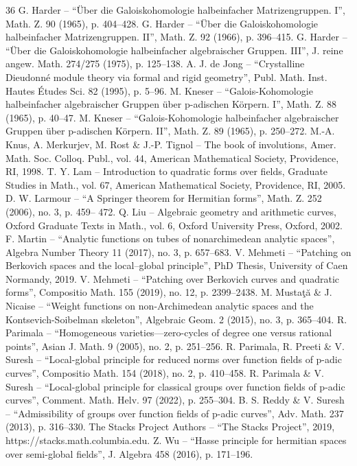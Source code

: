 \documentclass[10pt]{amsart}
\theoremstyle{definition}
\begin{document}
\begin{thebibliography}{36}
 G. Harder – “Über die Galoiskohomologie halbeinfacher Matrizengruppen. I”, Math. Z. 90 (1965), p. 404–428.
 G. Harder – “Über die Galoiskohomologie halbeinfacher Matrizengruppen. II”, Math. Z. 92 (1966), p. 396–415.
 G. Harder – “Über die Galoiskohomologie halbeinfacher algebraischer Gruppen. III”, J. reine angew. Math. 274/275 (1975), p. 125–138.
 A. J. de Jong – “Crystalline Dieudonné module theory via formal and rigid geometry”, Publ. Math. Inst. Hautes Études Sci. 82 (1995), p. 5–96.
 M. Kneser – “Galois-Kohomologie halbeinfacher algebraischer Gruppen über p-adischen Körpern. I”, Math. Z. 88 (1965), p. 40–47.
 M. Kneser – “Galois-Kohomologie halbeinfacher algebraischer Gruppen über p-adischen Körpern. II”, Math. Z. 89 (1965), p. 250–272.
 M.-A. Knus, A. Merkurjev, M. Rost \& J.-P. Tignol – The book of involutions, Amer. Math. Soc. Colloq. Publ., vol. 44, American Mathematical Society, Providence, RI, 1998.
 T. Y. Lam – Introduction to quadratic forms over fields, Graduate Studies in Math., vol. 67, American Mathematical Society, Providence, RI, 2005.
 D. W. Larmour – “A Springer theorem for Hermitian forms”, Math. Z. 252 (2006), no. 3, p. 459– 472.
 Q. Liu – Algebraic geometry and arithmetic curves, Oxford Graduate Texts in Math., vol. 6, Oxford University Press, Oxford, 2002.
 F. Martin – “Analytic functions on tubes of nonarchimedean analytic spaces”, Algebra Number Theory 11 (2017), no. 3, p. 657–683.
 V. Mehmeti – “Patching on Berkovich spaces and the local–global principle”, PhD Thesis, University of Caen Normandy, 2019.
 V. Mehmeti – “Patching over Berkovich curves and quadratic forms”, Compositio Math. 155 (2019), no. 12, p. 2399–2438.
 M. Mustaţă \& J. Nicaise – “Weight functions on non-Archimedean analytic spaces and the Kontsevich-Soibelman skeleton”, Algebraic Geom. 2 (2015), no. 3, p. 365–404.
 R. Parimala – “Homogeneous varieties—zero-cycles of degree one versus rational points”, Asian J. Math. 9 (2005), no. 2, p. 251–256.
 R. Parimala, R. Preeti \& V. Suresh – “Local-global principle for reduced norms over function fields of p-adic curves”, Compositio Math. 154 (2018), no. 2, p. 410–458.
 R. Parimala \& V. Suresh – “Local-global principle for classical groups over function fields of p-adic curves”, Comment. Math. Helv. 97 (2022), p. 255–304.
 B. S. Reddy \& V. Suresh – “Admissibility of groups over function fields of p-adic curves”, Adv. Math. 237 (2013), p. 316–330.
 The Stacks Project Authors – “The Stacks Project”, 2019, https://stacks.math.columbia.edu.
 Z. Wu – “Hasse principle for hermitian spaces over semi-global fields”, J. Algebra 458 (2016), p. 171–196.
\end{thebibliography}
\end{document}

